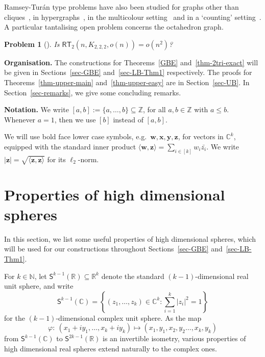 \documentclass[11pt, a4paper]{article}
\newcommand\innerp[1]{\langle #1 \rangle}
\newcommand{\V}[1]{\mathbold{#1}}
\newtheorem{probx}[conjx]{Problem}
\theoremstyle{definition}
\newcommand{\sS}{\mathsf{S}}
\newcommand{\sN}{\mathbb{N}}
\newcommand{\sC}{\mathbb{C}}
\newcommand{\sR}{\mathbb{R}}
\newcommand{\rt}{{\mathsf{RT}}}
\begin{document}
Ramsey-Tur\'an type problems have also been studied for graphs other than cliques~\cite{BMSh,EHSSz,NP,Sudakov}, in hypergraphs~\cite{BL-1,ES2,FranklRodl,MubayiRodl,MubayiSos,Sidorenko}, in the multicolour setting~\cite{EHSSSz2,KKL,LNS,Schelp} and in a `counting' setting~\cite{BLSh}.
A particular tantalising open problem concerns the octahedron graph.

\begin{probx}[\cite{EHSSSz2,EHSSz,SimSos,Sudakov}]
Is $\rt_2(n,K_{2,2,2},o(n))=o(n^2)$?
\end{probx}

\medskip

\noindent
\textbf{Organisation.} The constructions for Theorems~\ref{GBE} and~\ref{thm-2tri-exact} will be given in Sections~\ref{sec-GBE} and~\ref{sec-LB-Thm1} respectively. The proofs for Theorems~\ref{thm-upper-main} and~\ref{thm-upper-easy} are in Section~\ref{sec-UB}. In Section~\ref{sec-remarks}, we give some concluding remarks.

\medskip

\noindent
\textbf{Notation.} We write $[a,b]:=\{a,\ldots,b\}\subseteq \mathbb{Z}$, for all $a,b\in \mathbb{Z}$ with $a\le b$. Whenever $a=1$, then we use $[b]$ instead of $[a,b]$. 

We will use bold face lower case symbols, e.g.~$\V{w}, \V{x}, \V{y}, \V{z}$, for vectors in $\sC^{k}$, equipped with the standard inner product $\innerp{\V{w},\V{z}}=\sum_{i\in [k]}w_i\bar{z_i}$. We write $|\V{z}|=\sqrt{\innerp{\V{z},\V{z}}}$ for its $\ell_2$-norm.

\section{Properties of high dimensional spheres}\label{sec-propertiesHDS}
In this section, we list some useful properties of high dimensional spheres, which will be used for our constructions throughout Sections~\ref{sec-GBE} and~\ref{sec-LB-Thm1}.

For $k\in\sN$, let $\sS^{k-1}(\sR)\subseteq \sR^{k}$ denote the standard $(k-1)$-dimensional real unit sphere, and write
$$\sS^{k-1}(\sC)=\left\{(z_1,\ldots, z_{k})\in\sC^{k}: \sum_{i=1}^{k}|z_i|^2=1\right\}$$
for the $(k-1)$-dimensional complex unit sphere.  As the map
\begin{equation}\label{eq: isom}
	\varphi:~ (x_1+iy_1,\ldots, x_k+iy_k)\longmapsto (x_1,y_1,x_2,y_2\ldots,x_k,y_k)
\end{equation}
from $\sS^{k-1}(\sC)$ to $\sS^{2k-1}(\sR)$ is an invertible isometry, various properties of high dimensional real spheres extend naturally to the complex ones.
\end{document}
